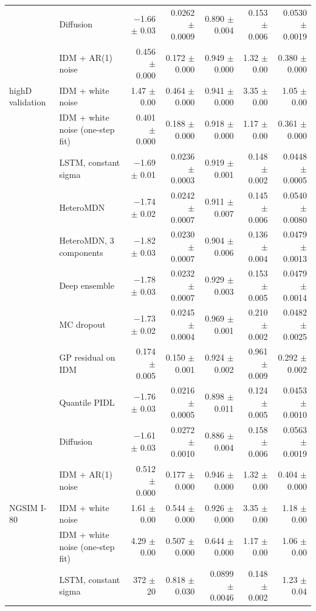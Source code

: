 \begin{longtable}{llrrrrr}
 & Diffusion & $-$1.66 $\pm$ 0.03 & 0.0262 $\pm$ 0.0009 & 0.890 $\pm$ 0.004 & 0.153 $\pm$ 0.006 & 0.0530 $\pm$ 0.0019 \\
 & IDM + AR(1) noise & 0.456 $\pm$ 0.000 & 0.172 $\pm$ 0.000 & 0.949 $\pm$ 0.000 & 1.32 $\pm$ 0.00 & 0.380 $\pm$ 0.000 \\
\midrule
highD validation & IDM + white noise & 1.47 $\pm$ 0.00 & 0.464 $\pm$ 0.000 & 0.941 $\pm$ 0.000 & 3.35 $\pm$ 0.00 & 1.05 $\pm$ 0.00 \\
 & IDM + white noise (one-step fit) & 0.401 $\pm$ 0.000 & 0.188 $\pm$ 0.000 & 0.918 $\pm$ 0.000 & 1.17 $\pm$ 0.00 & 0.361 $\pm$ 0.000 \\
 & LSTM, constant sigma & $-$1.69 $\pm$ 0.01 & 0.0236 $\pm$ 0.0003 & 0.919 $\pm$ 0.001 & 0.148 $\pm$ 0.002 & 0.0448 $\pm$ 0.0005 \\
 & HeteroMDN & $-$1.74 $\pm$ 0.02 & 0.0242 $\pm$ 0.0007 & 0.911 $\pm$ 0.007 & 0.145 $\pm$ 0.006 & 0.0540 $\pm$ 0.0080 \\
 & HeteroMDN, 3 components & $-$1.82 $\pm$ 0.03 & 0.0230 $\pm$ 0.0007 & 0.904 $\pm$ 0.006 & 0.136 $\pm$ 0.004 & 0.0479 $\pm$ 0.0013 \\
 & Deep ensemble & $-$1.78 $\pm$ 0.03 & 0.0232 $\pm$ 0.0007 & 0.929 $\pm$ 0.003 & 0.153 $\pm$ 0.005 & 0.0479 $\pm$ 0.0014 \\
 & MC dropout & $-$1.73 $\pm$ 0.02 & 0.0245 $\pm$ 0.0004 & 0.969 $\pm$ 0.001 & 0.210 $\pm$ 0.002 & 0.0482 $\pm$ 0.0025 \\
 & GP residual on IDM & 0.174 $\pm$ 0.005 & 0.150 $\pm$ 0.001 & 0.924 $\pm$ 0.002 & 0.961 $\pm$ 0.009 & 0.292 $\pm$ 0.002 \\
 & Quantile PIDL & $-$1.76 $\pm$ 0.03 & 0.0216 $\pm$ 0.0005 & 0.898 $\pm$ 0.011 & 0.124 $\pm$ 0.005 & 0.0453 $\pm$ 0.0010 \\
 & Diffusion & $-$1.61 $\pm$ 0.03 & 0.0272 $\pm$ 0.0010 & 0.886 $\pm$ 0.004 & 0.158 $\pm$ 0.006 & 0.0563 $\pm$ 0.0019 \\
 & IDM + AR(1) noise & 0.512 $\pm$ 0.000 & 0.177 $\pm$ 0.000 & 0.946 $\pm$ 0.000 & 1.32 $\pm$ 0.00 & 0.404 $\pm$ 0.000 \\
\midrule
NGSIM I-80 & IDM + white noise & 1.61 $\pm$ 0.00 & 0.544 $\pm$ 0.000 & 0.926 $\pm$ 0.000 & 3.35 $\pm$ 0.00 & 1.18 $\pm$ 0.00 \\
 & IDM + white noise (one-step fit) & 4.29 $\pm$ 0.00 & 0.507 $\pm$ 0.000 & 0.644 $\pm$ 0.000 & 1.17 $\pm$ 0.00 & 1.06 $\pm$ 0.00 \\
 & LSTM, constant sigma & 372 $\pm$ 20 & 0.818 $\pm$ 0.030 & 0.0899 $\pm$ 0.0046 & 0.148 $\pm$ 0.002 & 1.23 $\pm$ 0.04 \\

\end{longtable}
